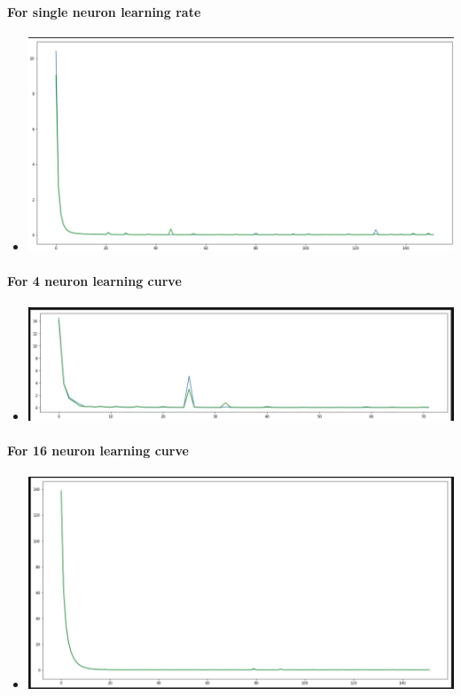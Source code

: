 \documentclass[11pt, a4paper , landscape]{article}
\makeatletter
\def\maxwidth{\ifdim\Gin@nat@width>\linewidth\linewidth
    \else\Gin@nat@width\fi}
\let\Oldincludegraphics\includegraphics
\renewcommand{\includegraphics}[1]{\Oldincludegraphics[width=.8\maxwidth]{#1}}
\providecommand{\tightlist}{%
      \setlength{\itemsep}{0pt}\setlength{\parskip}{0pt}}
\makeatother
\begin{document}
\paragraph{For single neuron learning
rate}\label{for-single-neuron-learning-rate}

\begin{itemize}
\tightlist
\item
  \includegraphics{img/1.png}
\end{itemize}

\paragraph{For 4 neuron learning
curve}\label{for-4-neuron-learning-curve}

\begin{itemize}
\tightlist
\item
  \includegraphics{img/4.png}
\end{itemize}

\paragraph{For 16 neuron learning
curve}\label{for-16-neuron-learning-curve}

\begin{itemize}
\tightlist
\item
  \includegraphics{img/16.png}
\end{itemize}
\end{document}
